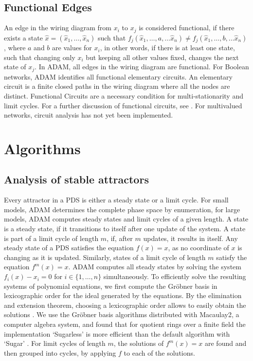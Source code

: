\documentclass[10pt]{bmc_article}
\newenvironment{bmcformat}{\begin{raggedright}\baselineskip20pt\sloppy\setboolean{publ}{false}}{\end{raggedright}\baselineskip20pt\sloppy}
\begin{document}
\begin{bmcformat}
\subsection{Functional Edges} \label{sec:func}
An edge in the wiring diagram from $x_i$ to $x_j$ is considered
functional, if there exists a state $\hat x = (\hat x_1,  \ldots, \hat x_n)$ such
that $f_j( \hat x_1,  \ldots, a, \ldots \hat x_n) \neq f_j(\hat x_1, \ldots, b, \ldots
\hat x_n)$, where $a$ and $b$ are values for $x_i$, in other words, if there
is at least one state, such that changing only $x_i$ but keeping all other
values fixed, changes the next state of $x_j$.
In ADAM, all edges in the wiring diagram are functional.
For Boolean networks, ADAM identifies all functional elementary circuits. An elementary circuit is a finite closed paths in the wiring diagram where all the nodes are distinct. Functional Circuits are a necessary condition for multi-stationarity and limit cycles. For a further discussion of
functional circuits, see \cite{Chaouiya}. For multivalued networks, circuit analysis has not yet been implemented.
\section{Algorithms}
\subsection{Analysis of stable attractors}
Every attractor in a PDS is either a
steady state or a limit cycle. For small models, ADAM determines the complete
phase space by enumeration, for large models, ADAM computes steady states and
limit cycles of a given length.
A state is a steady state, if it transitions to itself after one update of the
system. A state is part of a limit cycle of length $m$, if,
after $m$ updates, it results in itself. Any steady state of a PDS satisfies
the equation $f(x) = x$, as no coordinate of $x$ is changing as it is updated.
Similarly, states of a
limit cycle of length $m$ satisfy the equation $f^m(x) = x$. ADAM computes all
steady states by solving the system $f_i(x) - x_i = 0$ for $i \in \{1, \ldots,
n\}$ simultaneously. To efficiently solve the resulting systems of polynomial
equations, we first compute the Gr\"obner
basis in lexicographic order for the ideal generated by the equations.
By the elimination and extension theorem, choosing a lexicographic order
allows to easily obtain the solutions \cite{IVA}.
We use the Gr\"obner basis algorithms distributed with Macaulay2, a
computer algebra system, and found that for quotient rings over a finite field
the implementation `Sugarless' is more efficient than the default algorithm
with `Sugar' \cite{M2,Sugar:1991}.
For limit cycles of length $m$, the solutions of $f^m(x)=x$ are found and then
grouped into cycles, by applying $f$ to each of the solutions.


\end{bmcformat}
\end{document}
